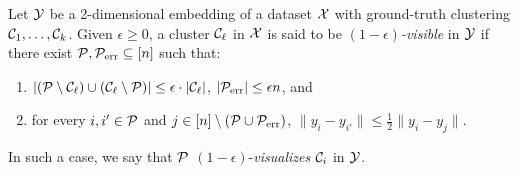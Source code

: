 \begin{defn}
Let $\mathcal{Y}$ be a 2-dimensional embedding of a dataset $\mathcal{X}$ with ground-truth clustering $\mathcal{C}_1, \ldots, \mathcal{C}_k$.
Given $\epsilon \ge 0$, a cluster $\mathcal{C}_\ell$ in $\mathcal{X}$ is said to be $(1-\epsilon)$\emph{-visible} in $\mathcal{Y}$ if there exist $\mathcal{P}, \mathcal{P}_{\mathrm{err}} \subseteq [n]$ %
such that:
\begin{enumerate}
\item $|(\mathcal{P}\setminus \mathcal{C}_{\ell}) \cup (\mathcal{C}_{\ell}\setminus \mathcal{P})| \le \epsilon \cdot |\mathcal{C}_{\ell}|$, $|\mathcal{P}_{\mathrm{err}}|\le \epsilon n$, and %
\item for every $i, {i'} \in \mathcal{P}$ and $j  \in [n] \setminus (\mathcal{P}\cup \mathcal{P}_{\mathrm{err}})$, $\|y_i - y_{i'}\| \leq \frac12 \|y_i - y_j\|$. 
\end{enumerate}
In such a case, we say that $\mathcal{P}$ $(1-\epsilon)$-\emph{visualizes} $\mathcal{C}_i$ in $\mathcal{Y}$. %
\end{defn}



